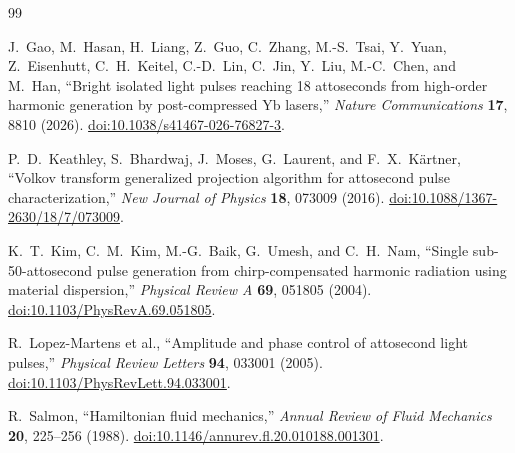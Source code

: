 \begin{thebibliography}{99}

J.~Gao, M.~Hasan, H.~Liang, Z.~Guo, C.~Zhang, M.-S.~Tsai,
Y.~Yuan, Z.~Eisenhutt, C.~H.~Keitel, C.-D.~Lin, C.~Jin,
Y.~Liu, M.-C.~Chen, and M.~Han,
``Bright isolated light pulses reaching 18 attoseconds from high-order harmonic generation by post-compressed Yb lasers,''
\emph{Nature Communications} \textbf{17}, 8810 (2026).
\href{https://doi.org/10.1038/s41467-026-76827-3}{doi:10.1038/s41467-026-76827-3}.

P.~D.~Keathley, S.~Bhardwaj, J.~Moses, G.~Laurent, and F.~X.~K\"artner,
``Volkov transform generalized projection algorithm for attosecond pulse characterization,''
\emph{New Journal of Physics} \textbf{18}, 073009 (2016).
\href{https://doi.org/10.1088/1367-2630/18/7/073009}{doi:10.1088/1367-2630/18/7/073009}.

K.~T.~Kim, C.~M.~Kim, M.-G.~Baik, G.~Umesh, and C.~H.~Nam,
``Single sub-50-attosecond pulse generation from chirp-compensated harmonic radiation using material dispersion,''
\emph{Physical Review A} \textbf{69}, 051805 (2004).
\href{https://doi.org/10.1103/PhysRevA.69.051805}{doi:10.1103/PhysRevA.69.051805}.

R.~Lopez-Martens et al.,
``Amplitude and phase control of attosecond light pulses,''
\emph{Physical Review Letters} \textbf{94}, 033001 (2005).
\href{https://doi.org/10.1103/PhysRevLett.94.033001}{doi:10.1103/PhysRevLett.94.033001}.

\n{}
R.~Salmon,
``Hamiltonian fluid mechanics,''
\emph{Annual Review of Fluid Mechanics} \textbf{20}, 225--256 (1988).
\href{https://doi.org/10.1146/annurev.fl.20.010188.001301}{doi:10.1146/annurev.fl.20.010188.001301}.

\end{thebibliography}
